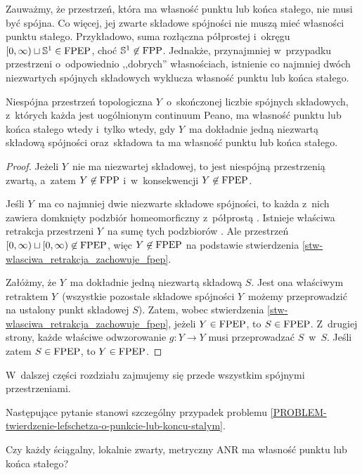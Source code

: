Zauważmy, że przestrzeń, która ma własność punktu lub końca stałego, nie musi być spójna. Co więcej, jej zwarte składowe spójności nie muszą mieć własności punktu stałego. Przykładowo, suma rozłączna półprostej i~okręgu $[0,\infty)\sqcup \mathbb{S}^1\in \mathrm{FPEP}$, choć $\mathbb{S}^1\not\in\mathrm{FPP}$. Jednakże, przynajmniej w~przypadku przestrzeni o~odpowiednio ,,dobrych'' własnościach, istnienie co najmniej dwóch  niezwartych spójnych składowych wyklucza własność punktu lub końca stałego.

\begin{stw}
Niespójna przestrzeń topologiczna $Y$~o~skończonej liczbie spójnych składowych, z~których każda jest uogólnionym continuum Peano, ma własność punktu lub końca stałego wtedy i~tylko wtedy, gdy $Y$~ma dokładnie jedną niezwartą składową spójności oraz~składowa ta ma własność punktu lub końca stałego. 
\end{stw}
\begin{proof}
Jeżeli $Y$~nie ma niezwartej składowej, to jest niespójną przestrzenią zwartą, a~zatem $Y\not\in\mathrm{FPP}$ i~w~konsekwencji $Y\not\in\mathrm{FPEP}$.

Jeśli $Y$~ma co najmniej dwie niezwarte składowe spójności, to każda z~nich zawiera domknięty podzbiór homeomorficzny z~półprostą \cite[9.28]{Walker74}. Istnieje właściwa retrakcja przestrzeni $Y$~na sumę tych podzbiorów \cite{Sher75}. Ale przestrzeń $[0,\infty)\sqcup [0,\infty)\not\in\mathrm{FPEP}$, więc $Y\not\in\mathrm{FPEP}$ na podstawie stwierdzenia \ref{stw-wlasciwa_retrakcja_zachowuje_fpep}.

Załóżmy, że $Y$~ma dokładnie jedną niezwartą składową $S$. Jest ona właściwym retraktem $Y$~(wszystkie pozostałe składowe spójności $Y$~możemy przeprowadzić na ustalony punkt składowej $S$). Zatem, wobec stwierdzenia \ref{stw-wlasciwa_retrakcja_zachowuje_fpep}, jeżeli \mbox{$Y\in\mathrm{FPEP}$}, to $S\in\mathrm{FPEP}$. Z~drugiej strony, każde właściwe odwzorowanie $g\colon Y\to Y$ musi przeprowadzać $S$~w~$S$. Jeśli zatem $S\in\mathrm{FPEP}$, to $Y\in\mathrm{FPEP}$.
\end{proof}

W~dalszej części rozdziału zajmujemy się przede wszystkim spójnymi przestrzeniami.

Następujące pytanie stanowi szczególny przypadek problemu \ref{PROBLEM-twierdzenie-lefschetza-o-punkcie-lub-koncu-stalym}.

\begin{problem}\label{PROBLEM-sciagalny-ma-fpep}
Czy każdy ściągalny, lokalnie zwarty, metryczny ANR ma własność punktu lub końca stałego?
\end{problem}




